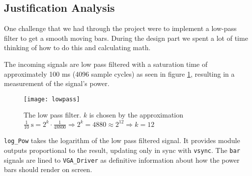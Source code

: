 \subsection{Justification Analysis}

One challenge that we had through the project were to implement a low-pass filter to get a smooth moving bars. During the design part we spent a lot of time thinking of how to do this and calculating math.

The incoming signals are low pass filtered with a saturation time of approximately 100 ms (4096 sample cycles) as seen in figure \ref{fig:lowpass}, resulting in a measurement of the signal's power. 

\begin{figure}[h]
\centering
\texttt{[image: lowpass]}
\caption{The low pass filter. $k$ is chosen by the approximation $\frac{1}{10}\mathrm{\ s} = 2^k\cdot\frac{1}{48800}\Rightarrow 2^k=4880\approx 2^{12}\Rightarrow k = 12 $}
\label{fig:lowpass}
\end{figure}


\verb=log_Pow= takes the logarithm of the low pass filtered signal. It provides module outputs proportional to the result, updating only in sync with \verb+vsync+. The \verb+bar+ signals are lined to \verb+VGA_Driver+ as definitive information about how the power bars should render on screen.

